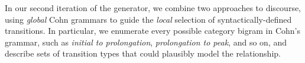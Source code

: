 \noindent In our second iteration of the generator, we combine two
approaches to discourse, using {\em global} Cohn grammars to guide the {\em
local} selection of syntactically-defined transitions.
%
%
In particular, we enumerate every possible category bigram in Cohn's grammar,
such as {\em initial to prolongation}, {\em prolongation to peak}, and so
on, and describe sets of transition types that could plausibly model the
relationship. 
%
%
